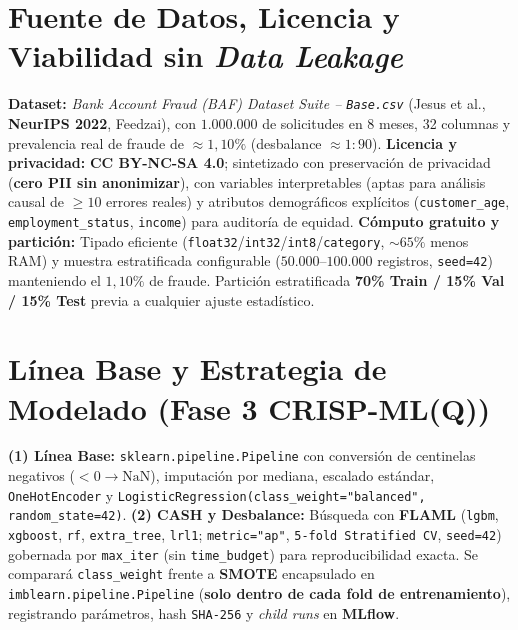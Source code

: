 \documentclass[9pt,letterpaper]{article}
\begin{document}
\section{Fuente de Datos, Licencia y Viabilidad sin \textit{Data Leakage}}
\textbf{Dataset:} \textit{Bank Account Fraud (BAF) Dataset Suite -- \texttt{Base.csv}} (Jesus et al., \textbf{NeurIPS 2022}, Feedzai), con $1.000.000$ de solicitudes en 8 meses, 32 columnas y prevalencia real de fraude de \textbf{$\approx 1,10\%$} (desbalance $\approx 1\!:\!90$). \textbf{Licencia y privacidad:} \textbf{CC BY-NC-SA 4.0}; sintetizado con preservación de privacidad (\textbf{cero PII sin anonimizar}), con variables interpretables (aptas para análisis causal de $\ge 10$ errores reales) y atributos demográficos explícitos (\texttt{customer\_age}, \texttt{employment\_status}, \texttt{income}) para auditoría de equidad. \textbf{Cómputo gratuito y partición:} Tipado eficiente (\texttt{float32}/\texttt{int32}/\texttt{int8}/\texttt{category}, $\sim 65\%$ menos RAM) y muestra estratificada configurable ($50.000$--$100.000$ registros, \texttt{seed=42}) manteniendo el $1,10\%$ de fraude. Partición estratificada \textbf{70\% Train / 15\% Val / 15\% Test} previa a cualquier ajuste estadístico.

\section{Línea Base y Estrategia de Modelado (Fase 3 CRISP-ML(Q))}
\textbf{(1) Línea Base:} \texttt{sklearn.pipeline.Pipeline} con conversión de centinelas negativos ($<0 \to \text{NaN}$), imputación por mediana, escalado estándar, \texttt{OneHotEncoder} y \texttt{LogisticRegression(class\_weight="balanced", random\_state=42)}. \textbf{(2) CASH y Desbalance:} Búsqueda con \textbf{FLAML} (\texttt{lgbm}, \texttt{xgboost}, \texttt{rf}, \texttt{extra\_tree}, \texttt{lrl1}; \texttt{metric="ap"}, \texttt{5-fold Stratified CV}, \texttt{seed=42}) gobernada por \texttt{max\_iter} (sin \texttt{time\_budget}) para reproducibilidad exacta. Se comparará \texttt{class\_weight} frente a \textbf{SMOTE} encapsulado en \texttt{imblearn.pipeline.Pipeline} (\textbf{solo dentro de cada fold de entrenamiento}), registrando parámetros, hash \texttt{SHA-256} y \textit{child runs} en \textbf{MLflow}.
\end{document}
